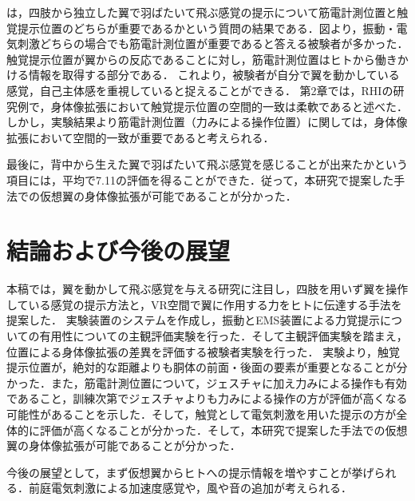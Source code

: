 \begin{small}
        は，四肢から独立した翼で羽ばたいて飛ぶ感覚の提示について筋電計測位置と触覚提示位置のどちらが重要であるかという質問の結果である．図より，振動・電気刺激どちらの場合でも筋電計測位置が重要であると答える被験者が多かった．
        触覚提示位置が翼からの反応であることに対し，筋電計測位置はヒトから働きかける情報を取得する部分である．
        これより，被験者が自分で翼を動かしている感覚，自己主体感を重視していると捉えることができる．
        第2章では，RHIの研究例\cite{armel2003projecting}で，身体像拡張において触覚提示位置の空間的一致は柔軟であると述べた．しかし，実験結果より筋電計測位置（力みによる操作位置）に関しては，身体像拡張において空間的一致が重要であると考えられる．


        最後に，背中から生えた翼で羽ばたいて飛ぶ感覚を感じることが出来たかという項目には，平均で7.11の評価を得ることができた．従って，本研究で提案した手法での仮想翼の身体像拡張が可能であることが分かった．


\section{結論および今後の展望}
    本稿では，翼を動かして飛ぶ感覚を与える研究に注目し，四肢を用いず翼を操作している感覚の提示方法と，VR空間で翼に作用する力をヒトに伝達する手法を提案した．
    実験装置のシステムを作成し，振動とEMS装置による力覚提示についての有用性についての主観評価実験を行った．そして主観評価実験を踏まえ，位置による身体像拡張の差異を評価する被験者実験を行った．
    実験より，触覚提示位置が，絶対的な距離よりも胴体の前面・後面の要素が重要となることが分かった．また，筋電計測位置について，ジェスチャに加え力みによる操作も有効であること，訓練次第でジェスチャよりも力みによる操作の方が評価が高くなる可能性があることを示した．そして，触覚として電気刺激を用いた提示の方が全体的に評価が高くなることが分かった．そして，本研究で提案した手法での仮想翼の身体像拡張が可能であることが分かった．

    
    今後の展望として，まず仮想翼からヒトへの提示情報を増やすことが挙げられる．前庭電気刺激による加速度感覚\cite{maeda2005shaking}\cite{青山一真2014前庭電気刺激における逆方向不感電流を用いた加速度感覚の増強}や，風や音の追加が考えられる．


\end{small}
